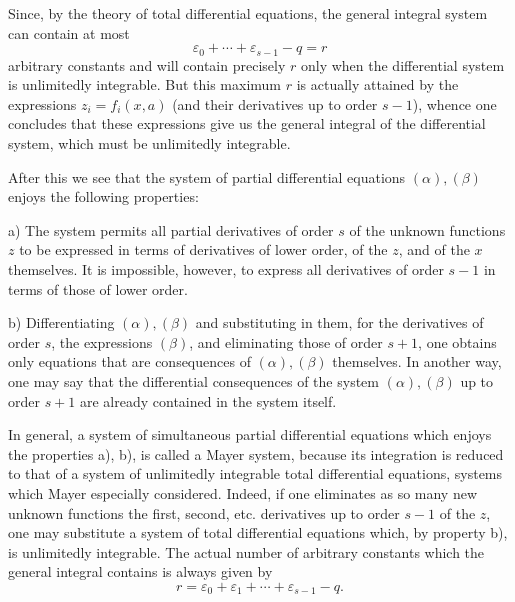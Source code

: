 \documentclass[11pt]{book}
\begin{document}
Since, by the theory of total differential equations, the general integral system can contain at most
\[
 \varepsilon_0+\cdots+\varepsilon_{s-1}-q=r
\]
arbitrary constants and will contain precisely $r$ only when the differential system is unlimitedly integrable. But this maximum $r$ is actually attained by the expressions $z_i=f_i(x,a)$ (and their derivatives up to order $s-1$), whence one concludes that these expressions give us the general integral of the differential system, which must be unlimitedly integrable.

After this we see that the system of partial differential equations $(\alpha),(\beta)$ enjoys the following properties:

a) The system permits all partial derivatives of order $s$ of the unknown functions $z$ to be expressed in terms of derivatives of lower order, of the $z$, and of the $x$ themselves. It is impossible, however, to express all derivatives of order $s-1$ in terms of those of lower order\begingroup\renewcommand\thefootnote{(*)}\footnotemark\endgroup.
\begingroup\renewcommand\thefootnote{(*)}\endgroup{}

b) Differentiating $(\alpha),(\beta)$ and substituting in them, for the derivatives of order $s$, the expressions $(\beta)$, and eliminating those of order $s+1$, one obtains only equations that are consequences of $(\alpha),(\beta)$ themselves\begingroup\renewcommand\thefootnote{(**)}\footnotemark\endgroup. In another way, one may say that the differential consequences of the system $(\alpha),(\beta)$ up to order $s+1$ are already contained in the system itself.
\begingroup\renewcommand\thefootnote{(**)}\endgroup{}

In general, a system of simultaneous partial differential equations which enjoys the properties a), b), is called a Mayer system, because its integration is reduced to that of a system of unlimitedly integrable total differential equations, systems which Mayer especially considered. Indeed, if one eliminates as so many new unknown functions the first, second, etc. derivatives up to order $s-1$ of the $z$, one may substitute a system of total differential equations which, by property b), is unlimitedly integrable. The actual number of arbitrary constants which the general integral contains is always given by
\[
 r=\varepsilon_0+\varepsilon_1+\cdots+\varepsilon_{s-1}-q.
\]
\end{document}

